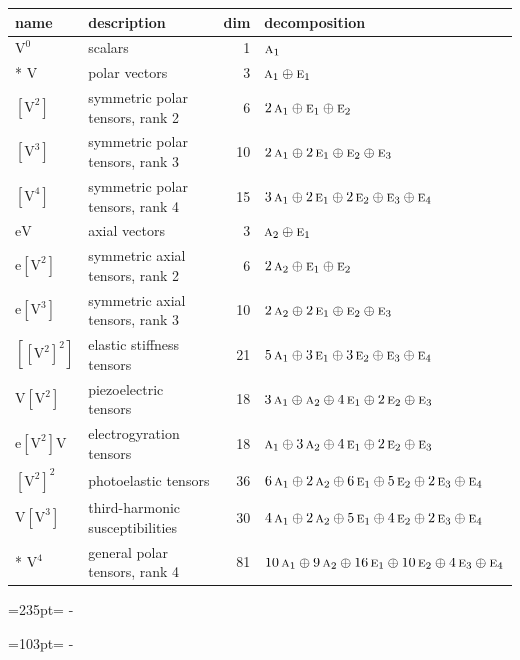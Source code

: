 \documentclass[10pt,a4paper]{article}
\newcommand{\needspace}[1]{\par\penalty-100\begingroup\dimen0=#1\relax\dimen2=\pagegoal
  \advance\dimen2-\pagetotal\ifdim\dimen0>\dimen2\relax\ifdim\dimen2>0pt\vfil\break\fi\fi
  \endgroup}
\numberwithin{equation}{section}
\newcommand{\irr}[1]{\text{\normalfont\scshape #1}}
\newcommand{\jahn}[1]{\mathrm{#1}}
\newlength{\fillwidth}\newlength{\cellwidth}\newlength{\colwidth}
\begin{document}
{\begin{longtable}{@{}llr>{\RaggedRight\arraybackslash}p{\fillwidth}@{}}
name & description & dim & decomposition\\\midrule\endhead
\bottomrule\endfoot\endlastfoot
$\jahn{V^{0}}$ & scalars & 1 & $\irr{a}_{1}$\\*
$\jahn{V}$ & polar vectors & 3 & $\irr{a}_{1} \oplus\allowbreak \irr{e}_{1}$\\
$\jahn{[V^{2}]}$ & symmetric polar tensors, rank 2 & 6 & $2\,\irr{a}_{1} \oplus\allowbreak \irr{e}_{1} \oplus\allowbreak \irr{e}_{2}$\\
$\jahn{[V^{3}]}$ & symmetric polar tensors, rank 3 & 10 & $2\,\irr{a}_{1} \oplus\allowbreak 2\,\irr{e}_{1} \oplus\allowbreak \irr{e}_{2} \oplus\allowbreak \irr{e}_{3}$\\
$\jahn{[V^{4}]}$ & symmetric polar tensors, rank 4 & 15 & $3\,\irr{a}_{1} \oplus\allowbreak 2\,\irr{e}_{1} \oplus\allowbreak 2\,\irr{e}_{2} \oplus\allowbreak \irr{e}_{3} \oplus\allowbreak \irr{e}_{4}$\\
$\jahn{eV}$ & axial vectors & 3 & $\irr{a}_{2} \oplus\allowbreak \irr{e}_{1}$\\
$\jahn{e[V^{2}]}$ & symmetric axial tensors, rank 2 & 6 & $2\,\irr{a}_{2} \oplus\allowbreak \irr{e}_{1} \oplus\allowbreak \irr{e}_{2}$\\
$\jahn{e[V^{3}]}$ & symmetric axial tensors, rank 3 & 10 & $2\,\irr{a}_{2} \oplus\allowbreak 2\,\irr{e}_{1} \oplus\allowbreak \irr{e}_{2} \oplus\allowbreak \irr{e}_{3}$\\
$\jahn{[[V^{2}]^{2}]}$ & elastic stiffness tensors & 21 & $5\,\irr{a}_{1} \oplus\allowbreak 3\,\irr{e}_{1} \oplus\allowbreak 3\,\irr{e}_{2} \oplus\allowbreak \irr{e}_{3} \oplus\allowbreak \irr{e}_{4}$\\
$\jahn{V[V^{2}]}$ & piezoelectric tensors & 18 & $3\,\irr{a}_{1} \oplus\allowbreak \irr{a}_{2} \oplus\allowbreak 4\,\irr{e}_{1} \oplus\allowbreak 2\,\irr{e}_{2} \oplus\allowbreak \irr{e}_{3}$\\
$\jahn{e[V^{2}]V}$ & electrogyration tensors & 18 & $\irr{a}_{1} \oplus\allowbreak 3\,\irr{a}_{2} \oplus\allowbreak 4\,\irr{e}_{1} \oplus\allowbreak 2\,\irr{e}_{2} \oplus\allowbreak \irr{e}_{3}$\\
$\jahn{[V^{2}]^{2}}$ & photoelastic tensors & 36 & $6\,\irr{a}_{1} \oplus\allowbreak 2\,\irr{a}_{2} \oplus\allowbreak 6\,\irr{e}_{1} \oplus\allowbreak 5\,\irr{e}_{2} \oplus\allowbreak 2\,\irr{e}_{3} \oplus\allowbreak \irr{e}_{4}$\\
$\jahn{V[V^{3}]}$ & third-harmonic susceptibilities & 30 & $4\,\irr{a}_{1} \oplus\allowbreak 2\,\irr{a}_{2} \oplus\allowbreak 5\,\irr{e}_{1} \oplus\allowbreak 4\,\irr{e}_{2} \oplus\allowbreak 2\,\irr{e}_{3} \oplus\allowbreak \irr{e}_{4}$\\*
$\jahn{V^{4}}$ & general polar tensors, rank 4 & 81 & $10\,\irr{a}_{1} \oplus\allowbreak 9\,\irr{a}_{2} \oplus\allowbreak 16\,\irr{e}_{1} \oplus\allowbreak 10\,\irr{e}_{2} \oplus\allowbreak 4\,\irr{e}_{3} \oplus\allowbreak \irr{e}_{4}$\\
\bottomrule\end{longtable}}
\needspace{235pt}
\needspace{103pt}
\end{document}
